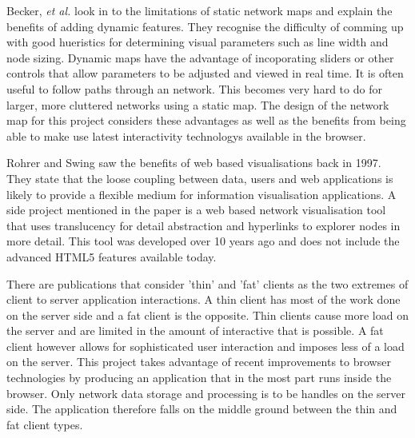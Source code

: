 \documentclass[11pt, a4paper]{article}
\begin{document}
Becker, \emph{et al.} look in to the limitations of static network maps and
explain the benefits of adding dynamic features.\cite{Becker_1990} They recognise the difficulty
of comming up with good hueristics for determining visual parameters such as
line width and node sizing. Dynamic maps have the advantage of incoporating
sliders or other controls that allow parameters to be adjusted and viewed in
real time. It is often useful to follow paths through an network. This becomes
very hard to do for larger, more cluttered networks using a static map. The
design of the network map for this project considers these advantages as well as
the benefits from being able to make use latest interactivity technologys
available in the browser.


Rohrer and Swing saw the benefits of web based visualisations back in
1997.\cite{Rohrer_1997} They state that the loose coupling between data, users
and web applications is likely to provide a flexible medium for information
visualisation applications.  A side project mentioned in the paper is a web
based network visualisation tool that uses translucency for detail abstraction
and hyperlinks to explorer nodes in more detail. This tool was developed over 10
years ago and does not include the advanced HTML5 features available today.

  
There are publications that consider 'thin' and 'fat' clients as the two
extremes of client to server application
interactions.\cite{Eick_2007}\cite{Jern_1998} A thin client has most of the work
done on the server side and a fat client is the opposite. Thin clients cause
more load on the server and are limited in the amount of interactive that is
possible. A fat client however allows for sophisticated user interaction and
imposes less of a load on the server. This project takes advantage of recent
improvements to browser technologies by producing an application that in the
most part runs inside the browser. Only network data storage and processing is
to be handles on the server side. The application therefore falls on the middle
ground between the thin and fat client types.
\end{document}
